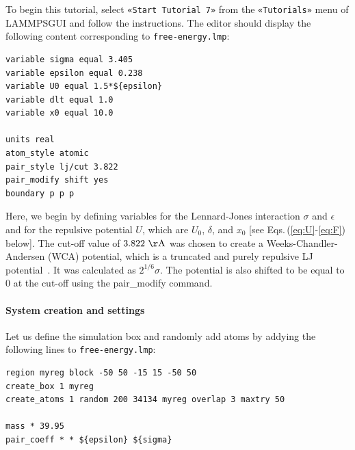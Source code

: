 \documentclass[9pt,tutorial]{livecoms}
\newcommand{\lmpcmd}[1]{\hspace{0pt}\colorbox{listing}{\textcolor{command}{\small{#1}}}\hspace{0pt}} %
\newcommand{\flecmd}[1]{\textcolor{command}{\texttt{#1}}} %
\newcommand{\guicmd}[1]{\textcolor{command}{\texttt{«#1»}}} %
\newcommand{\lammpsgui}{\textsf{LAMMPS\textendash GUI}}
\begin{document}
To begin this tutorial, select \guicmd{Start Tutorial 7} from the
\guicmd{Tutorials} menu of \lammpsgui{} and follow the instructions.
The editor should display the following content corresponding to \flecmd{free-energy.lmp}:
\begin{lstlisting}
variable sigma equal 3.405
variable epsilon equal 0.238
variable U0 equal 1.5*${epsilon}
variable dlt equal 1.0
variable x0 equal 10.0

units real
atom_style atomic
pair_style lj/cut 3.822
pair_modify shift yes
boundary p p p
\end{lstlisting}
Here, we begin by defining variables for the Lennard-Jones interaction
$\sigma$ and $\epsilon$ and for the repulsive potential
$U$, which are $U_0$, $\delta$, and
$x_0$ [see Eqs.\,(\ref{eq:U}-\ref{eq:F}) below].  The cut-off value of
$3.822~\mathrm{\AA{}}$ was chosen to create a Weeks-Chandler-Andersen (WCA) potential,
which is a truncated and purely repulsive LJ
potential~\cite{weeks1971role}.  It was calculated as $2^{1/6}
\sigma$.  The potential is also shifted to be equal to 0 at the cut-off
using the \lmpcmd{pair\_modify} command.  %

\paragraph{System creation and settings}

Let us define the simulation box and randomly add atoms by addying the
following lines to \flecmd{free-energy.lmp}:
\begin{lstlisting}
region myreg block -50 50 -15 15 -50 50
create_box 1 myreg
create_atoms 1 random 200 34134 myreg overlap 3 maxtry 50

mass * 39.95
pair_coeff * * ${epsilon} ${sigma}
\end{lstlisting}
\end{document}
